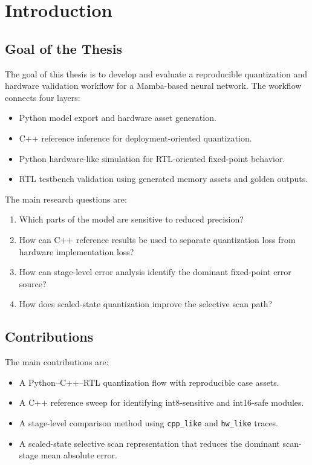 \chapter{Introduction}

\section{Goal of the Thesis}

The goal of this thesis is to develop and evaluate a reproducible quantization and hardware validation workflow for a Mamba-based neural network. The workflow connects four layers:

\begin{itemize}
  \item Python model export and hardware asset generation.
  \item C++ reference inference for deployment-oriented quantization.
  \item Python hardware-like simulation for RTL-oriented fixed-point behavior.
  \item RTL testbench validation using generated memory assets and golden outputs.
\end{itemize}

The main research questions are:

\begin{enumerate}
  \item Which parts of the model are sensitive to reduced precision?
  \item How can C++ reference results be used to separate quantization loss from hardware implementation loss?
  \item How can stage-level error analysis identify the dominant fixed-point error source?
  \item How does scaled-state quantization improve the selective scan path?
\end{enumerate}

\section{Contributions}

The main contributions are:

\begin{itemize}
  \item A Python--C++--RTL quantization flow with reproducible case assets.
  \item A C++ reference sweep for identifying int8-sensitive and int16-safe modules.
  \item A stage-level comparison method using \texttt{cpp\_like} and \texttt{hw\_like} traces.
  \item A scaled-state selective scan representation that reduces the dominant scan-stage mean absolute error.
\end{itemize}

